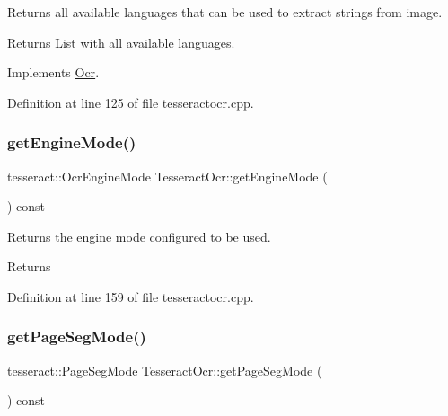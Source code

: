 Returns all available languages that can be used to extract strings from image. 

\begin{DoxyReturn}{Returns}
List with all available languages. 
\end{DoxyReturn}


Implements \mbox{\hyperlink{classOcr_a1b0eed20f8e7f553401834849d044bd2}{Ocr}}.



Definition at line 125 of file tesseractocr.\+cpp.

\mbox{\label{classTesseractOcr_a911234ba57781e4e33515e2f0eab4320}} 
\subsubsection{\texorpdfstring{get\+Engine\+Mode()}{getEngineMode()}}
{\footnotesize\ttfamily tesseract\+::\+Ocr\+Engine\+Mode Tesseract\+Ocr\+::get\+Engine\+Mode (\begin{DoxyParamCaption}{ }\end{DoxyParamCaption}) const}



Returns the engine mode configured to be used. 

\begin{DoxyReturn}{Returns}

\end{DoxyReturn}


Definition at line 159 of file tesseractocr.\+cpp.

\mbox{\label{classTesseractOcr_afd6329838570d29a97834f3c91f0bb2c}} 
\subsubsection{\texorpdfstring{get\+Page\+Seg\+Mode()}{getPageSegMode()}}
{\footnotesize\ttfamily tesseract\+::\+Page\+Seg\+Mode Tesseract\+Ocr\+::get\+Page\+Seg\+Mode (\begin{DoxyParamCaption}{ }\end{DoxyParamCaption}) const}



